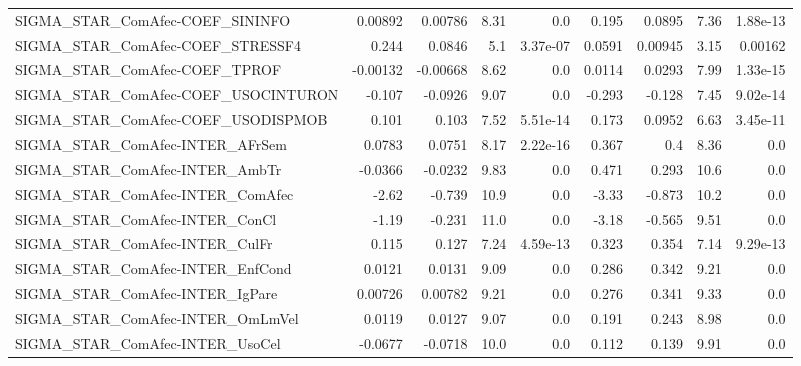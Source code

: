 \begin{tabular}{lrrrrrrrr}
SIGMA\_STAR\_ComAfec-COEF\_SININFO       &     0.00892 &      0.00786 &     8.31 &      0.0 &      0.195 &      0.0895 &         7.36 &      1.88e-13 \\
SIGMA\_STAR\_ComAfec-COEF\_STRESSF4      &       0.244 &       0.0846 &      5.1 & 3.37e-07 &     0.0591 &     0.00945 &         3.15 &       0.00162 \\
SIGMA\_STAR\_ComAfec-COEF\_TPROF         &    -0.00132 &     -0.00668 &     8.62 &      0.0 &     0.0114 &      0.0293 &         7.99 &      1.33e-15 \\
SIGMA\_STAR\_ComAfec-COEF\_USOCINTURON   &      -0.107 &      -0.0926 &     9.07 &      0.0 &     -0.293 &      -0.128 &         7.45 &      9.02e-14 \\
SIGMA\_STAR\_ComAfec-COEF\_USODISPMOB    &       0.101 &        0.103 &     7.52 & 5.51e-14 &      0.173 &      0.0952 &         6.63 &      3.45e-11 \\
SIGMA\_STAR\_ComAfec-INTER\_AFrSem       &      0.0783 &       0.0751 &     8.17 & 2.22e-16 &      0.367 &         0.4 &         8.36 &           0.0 \\
SIGMA\_STAR\_ComAfec-INTER\_AmbTr        &     -0.0366 &      -0.0232 &     9.83 &      0.0 &      0.471 &       0.293 &         10.6 &           0.0 \\
SIGMA\_STAR\_ComAfec-INTER\_ComAfec      &       -2.62 &       -0.739 &     10.9 &      0.0 &      -3.33 &      -0.873 &         10.2 &           0.0 \\
SIGMA\_STAR\_ComAfec-INTER\_ConCl        &       -1.19 &       -0.231 &     11.0 &      0.0 &      -3.18 &      -0.565 &         9.51 &           0.0 \\
SIGMA\_STAR\_ComAfec-INTER\_CulFr        &       0.115 &        0.127 &     7.24 & 4.59e-13 &      0.323 &       0.354 &         7.14 &      9.29e-13 \\
SIGMA\_STAR\_ComAfec-INTER\_EnfCond      &      0.0121 &       0.0131 &     9.09 &      0.0 &      0.286 &       0.342 &         9.21 &           0.0 \\
SIGMA\_STAR\_ComAfec-INTER\_IgPare       &     0.00726 &      0.00782 &     9.21 &      0.0 &      0.276 &       0.341 &         9.33 &           0.0 \\
SIGMA\_STAR\_ComAfec-INTER\_OmLmVel      &      0.0119 &       0.0127 &     9.07 &      0.0 &      0.191 &       0.243 &         8.98 &           0.0 \\
SIGMA\_STAR\_ComAfec-INTER\_UsoCel       &     -0.0677 &      -0.0718 &     10.0 &      0.0 &      0.112 &       0.139 &         9.91 &           0.0 \\

\end{tabular}
